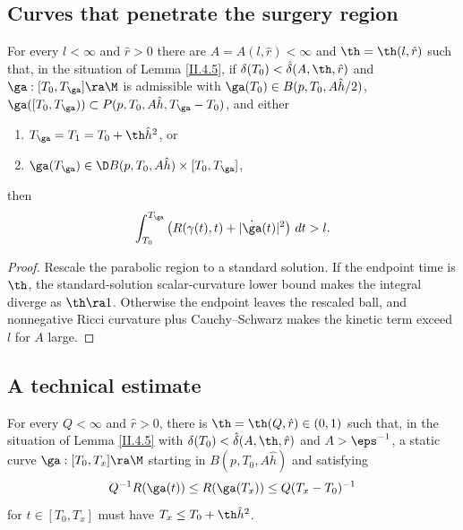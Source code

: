 \subsection{Curves that penetrate the surgery region}
\label{II.4.6}

\begin{corollary}
  \label{cor:kl-curves-that-penetrate-surgery-region-ricci-flow-surgery-corollary}
\label{corollaryII.4.6}
For every $l<\infty$ and $\hat r>0$ there are $A=A(l,\hat r)<\infty$ and
$\th=\th(l,\hat r)$ such that, in the situation of Lemma \ref{II.4.5},
if $\delta(T_0)<\hat\delta(A,\th,\hat r)$ and
$\ga:[T_0,T_\ga]\ra\M$ is admissible with
$\ga(T_0)\in B(p,T_0,A\hat h/2)$,
$\ga([T_0,T_\ga))\subset P(p,T_0,A\hat h,T_\ga-T_0)$, and either
\begin{enumerate}
\item $T_\ga=T_1=T_0+\th\hat h^2$, or
\item $\ga(T_\ga)\in\D B(p,T_0,A\hat h)\times[T_0,T_\ga]$,
\end{enumerate}
then
\begin{equation}
\int_{T_0}^{T_\ga}\left(R(\gamma(t),t)+|\dot\ga(t)|^2\right)\,dt>l.
\end{equation}
\end{corollary}
\begin{proof}
\sketch Rescale the parabolic region to a standard solution. If the endpoint
time is $\th$, the standard-solution scalar-curvature lower bound makes the
integral diverge as $\th\ra1$. Otherwise the endpoint leaves the rescaled
ball, and nonnegative Ricci curvature plus Cauchy--Schwarz makes the kinetic
term exceed $l$ for $A$ large.
\end{proof}

\subsection{A technical estimate}

\begin{corollary}
  \label{cor:kl-technical-estimate-existence-technical-estimate}
For every $Q<\infty$ and $\hat r>0$, there is
$\th=\th(Q,\hat r)\in(0,1)$ such that, in the situation of Lemma
\ref{II.4.5} with $\delta(T_0)<\hat\delta(A,\th,\hat r)$ and
$A>\eps^{-1}$, a static curve $\ga:[T_0,T_x]\ra\M$ starting in
$B(p,T_0,A\hat h)$ and satisfying
\begin{equation}
\label{Rbound}
Q^{-1}R(\ga(t))\leq R(\ga(T_x))\leq Q(T_x-T_0)^{-1}
\end{equation}
for $t\in[T_0,T_x]$ must have $T_x\leq T_0+\th\hat h^2$.
\end{corollary}

